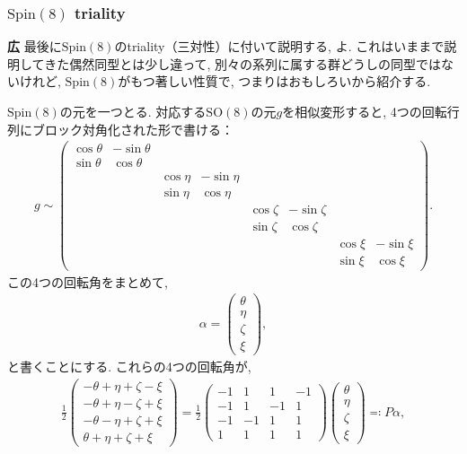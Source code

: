 \documentclass{ltjsarticle}
\theoremstyle{definition}
\begin{document}
\subsubsection{$\mathrm{Spin}(8)$ triality}
\noindent
\textbf{広} 最後に$\mathrm{Spin}(8)$のtriality（三対性）に付いて説明する, よ. これはいままで説明してきた偶然同型とは少し違って, 別々の系列に属する群どうしの同型ではないけれど, $\mathrm{Spin}(8)$がもつ著しい性質で, つまりはおもしろいから紹介する.\par
$\mathrm{Spin}(8)$の元を一つとる. 対応する$\mathrm{SO}(8)$の元$g$を相似変形すると, 4つの回転行列にブロック対角化された形で書ける：
\begin{gather}
  g\sim
  \begin{pmatrix}
    \cos\theta&-\sin\theta&&&&&&\\
    \sin\theta&\cos\theta&&&&&&\\
    &&\cos\eta&-\sin\eta&&&&\\
    &&\sin\eta&\cos\eta&&&&\\
    &&&&\cos\zeta&-\sin\zeta&&\\
    &&&&\sin\zeta&\cos\zeta&&\\
    &&&&&&\cos\xi&-\sin\xi\\
    &&&&&&\sin\xi&\cos\xi
  \end{pmatrix}.
\end{gather}
この4つの回転角をまとめて,
\begin{gather}
  \alpha=
  \begin{pmatrix}
    \theta\\
    \eta\\
    \zeta\\
    \xi
  \end{pmatrix},
\end{gather}
と書くことにする. これらの4つの回転角が,
\begin{align}
  \frac12
  \begin{pmatrix}
    -\theta+\eta+\zeta-\xi\\
    -\theta+\eta-\zeta+\xi\\
    -\theta-\eta+\zeta+\xi\\
    \theta+\eta+\zeta+\xi
  \end{pmatrix}
  =\frac12
  \begin{pmatrix}
    -1&1&1&-1\\
    -1&1&-1&1\\
    -1&-1&1&1\\
    1&1&1&1
  \end{pmatrix}
  \begin{pmatrix}
    \theta\\
    \eta\\
    \zeta\\
    \xi
  \end{pmatrix}
  \eqqcolon P\alpha,
\end{align}
\end{document}
